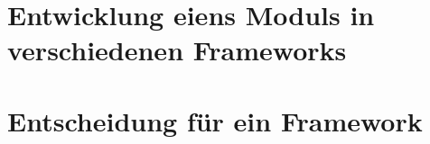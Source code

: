 \documentclass[ngerman]{article}
\begin{document}
    \section{Entwicklung eiens Moduls in verschiedenen Frameworks}
    \label{Neuentwicklung}
    \newpage\noindent
    \section{Entscheidung für ein Framework}
    \label{Entscheidung}
    \newpage\noindent
\end{document}
